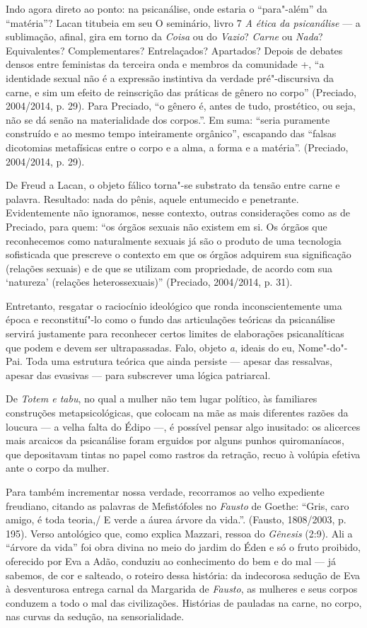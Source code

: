 Indo agora direto ao ponto: na psicanálise, onde estaria o ``para"-além''
da ``matéria''? Lacan titubeia em seu O seminário, livro 7 \emph{A ética
da psicanálise} --- a sublimação, afinal, gira em torno da \emph{Coisa}
ou do \emph{Vazio}? \emph{Carne} ou \emph{Nada}? Equivalentes?
Complementares? Entrelaçados? Apartados? Depois de debates densos entre
feministas da terceira onda e membros da comunidade +, ``a
identidade sexual não é a expressão instintiva da verdade pré"-discursiva
da carne, e sim um efeito de reinscrição das práticas de gênero no
corpo'' (Preciado, 2004/2014, p. 29). Para Preciado, ``o gênero é, antes
de tudo, prostético, ou seja, não se dá senão na materialidade dos
corpos.''. Em suma: ``seria puramente construído e ao mesmo tempo
inteiramente orgânico'', escapando das ``falsas dicotomias metafísicas
entre o corpo e a alma, a forma e a matéria''. (Preciado, 2004/2014, p.
29).

De Freud a Lacan, o objeto fálico torna"-se substrato da tensão entre
carne e palavra. Resultado: nada do pênis, aquele entumecido e
penetrante. Evidentemente não ignoramos, nesse contexto, outras
considerações como as de Preciado, para quem: ``os órgãos sexuais não
existem em si. Os órgãos que reconhecemos como naturalmente sexuais já
são o produto de uma tecnologia sofisticada que prescreve o contexto em
que os órgãos adquirem sua significação (relações sexuais) e de que se
utilizam com propriedade, de acordo com sua `natureza' (relações
heterossexuais)'' (Preciado, 2004/2014, p. 31).

Entretanto, resgatar o raciocínio ideológico que ronda inconscientemente
uma época e reconstituí"-lo como o fundo das articulações teóricas da
psicanálise servirá justamente para reconhecer certos limites de
elaborações psicanalíticas que podem e devem ser ultrapassadas. Falo,
objeto \emph{a}, ideais do eu, Nome"-do"-Pai. Toda uma estrutura teórica
que ainda persiste --- apesar das ressalvas, apesar das evasivas --- para
subscrever uma lógica patriarcal.

De \emph{Totem e tabu}, no qual a mulher não tem lugar político, às
familiares construções metapsicológicas, que colocam na mãe as mais
diferentes razões da loucura --- a velha falta do Édipo ---, é possível
pensar algo inusitado: os alicerces mais arcaicos da psicanálise foram
erguidos por alguns punhos quiromaníacos, que depositavam tintas no
papel como rastros da retração, recuo à volúpia efetiva ante o corpo da
mulher.

Para também incrementar nossa verdade, recorramos ao velho expediente
freudiano, citando as palavras de Mefistófoles no \emph{Fausto} de
Goethe: ``Gris, caro amigo, é toda teoria,/ E verde a áurea árvore da
vida.''. (Fausto, 1808/2003, p. 195). Verso antológico que, como explica
Mazzari, ressoa do \emph{Gênesis} (2:9). Ali a ``árvore da vida'' foi
obra divina no meio do jardim do Éden e só o fruto proibido, oferecido
por Eva a Adão, conduziu ao conhecimento do bem e do mal --- já sabemos,
de cor e salteado, o roteiro dessa história: da indecorosa sedução de
Eva à desventurosa entrega carnal da Margarida de \emph{Fausto}, as
mulheres e seus corpos conduzem a todo o mal das civilizações. Histórias
de pauladas na carne, no corpo, nas curvas da sedução, na
sensorialidade.

